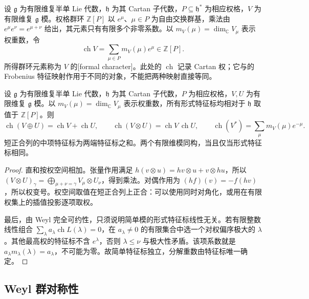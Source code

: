 \begin{definition}\label{b5:def:formal-character}
	设 \(\mathfrak g\) 为有限维复半单 Lie 代数，\(\mathfrak h\) 为其 Cartan 子代数，\(P\subseteq\mathfrak h^*\) 为相应权格，\(V\) 为有限维复 \(\mathfrak g\) 模。权格群环 \(\mathbb Z[P]\) 以 \(e^\mu\)、\(\mu\in P\) 为自由交换群基，乘法由 \(e^\mu e^\nu=e^{\mu+\nu}\) 给出，其元素只有有限多个非零系数。以 \(m_V(\mu)=\dim_{\mathbb C}V_\mu\) 表示权重数，令
	\[
		\operatorname{ch}V=\sum_{\mu\in P}m_V(\mu)e^\mu\in\mathbb Z[P].
	\]
	所得群环元素称为 \(V\) 的[formal character]。此处的 \(\operatorname{ch}\) 记录 Cartan 权；它与的 Frobenius 特征映射作用于不同的对象，不能把两种映射直接等同。
\end{definition}

\begin{proposition}\label{b5:prop:formal-character-operations}
	设 \(\mathfrak g\) 为有限维复半单 Lie 代数，\(\mathfrak h\) 为其 Cartan 子代数，\(P\) 为相应权格，\(V,U\) 为有限维复 \(\mathfrak g\) 模。以 \(m_V(\mu)=\dim_{\mathbb C}V_\mu\) 表示权重数，所有形式特征标均相对于 \(\mathfrak h\) 取值于 \(\mathbb Z[P]\)。则
	\[
		\operatorname{ch}(V\oplus U)=\operatorname{ch}V+\operatorname{ch}U, \qquad \operatorname{ch}(V\otimes U)=\operatorname{ch}V\,\operatorname{ch}U, \qquad \operatorname{ch}(V^*)=\sum_\mu m_V(\mu)e^{-\mu}.
	\]
	短正合列的中项特征标为两端特征标之和。两个有限维模同构，当且仅当形式特征标相同。
\end{proposition}
\begin{proof}
	直和按权空间相加。张量作用满足 \(h(v\otimes u)=hv\otimes u+v\otimes hu\)，所以 \((V\otimes U)_\gamma=\bigoplus_{\mu+\nu=\gamma}V_\mu\otimes U_\nu\)，得到乘法。对偶作用为 \((hf)(v)=-f(hv)\)，所以权变号。权空间取值在短正合列上正合：可以使用同时对角化，或用在有限权集上的插值投影逐项取权。

	最后，由 Weyl 完全可约性，只须说明简单模的形式特征标线性无关。若有限整数线性组合 \(\sum_\lambda a_\lambda\operatorname{ch}L(\lambda)=0\)，在 \(a_\lambda\ne0\) 的有限集合中选一个对权偏序极大的 \(\lambda\)。其他最高权的特征标不含 \(e^\lambda\)，否则 \(\lambda\le\nu\) 与极大性矛盾。该项系数就是 \(a_\lambda m_\lambda(\lambda)=a_\lambda\)，不可能为零。故简单特征标独立，分解重数由特征标唯一确定。
\end{proof}

\subsection{Weyl 群对称性}
\label{b5:subsec:1901:03}

